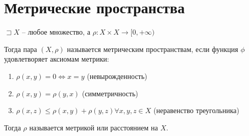     \section{Метрические пространства}
    \begin{definition}
        $\sqsupset X$ -- любое множество, а $\rho: X\times X \to [0,+\infty )$

        Тогда пара $(X, \rho)$ называется метрическим пространствам, если функция $\phi$ удовлетворяет аксиомам метрики:
        \begin{enumerate}
            \item $\rho(x,y) = 0 \iff x = y$ (невырожденность)
            \item $\rho(x,y) = \rho(y,x)$ (симметричность)
            \item $\rho(x,z) \leqslant \rho(x,y) + \rho(y,z) \forall x, y, z\in X$ (неравенство треугольника)
        \end{enumerate}

        Тогда $\rho$ называется метрикой или расстоянием на $X$.
    \end{definition}
